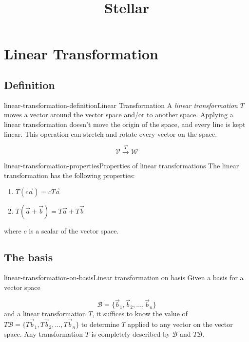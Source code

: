 \documentclass[preview]{standalone}
\begin{document}
\title{Stellar}
\genpage

\section{Linear Transformation}

\subsection{Definition}

\begin{snippetdefinition}{linear-transformation-definition}{Linear Transformation}
    A \textit{linear transformation} \(T\) moves a vector around the vector space and/or to another space.
    Applying a linear transformation doesn't move the origin of the space, and every line
    is kept linear. This operation can stretch and rotate every vector on the space.
    
    \[
        \mathcal{V} \xrightarrow{T} \mathcal{W}
    \]
\end{snippetdefinition}

\begin{snippetproposition}{linear-transformation-properties}{Properties of linear transformations}
    The linear transformation has the following properties:

    \begin{enumerate}
        \item \(T(c\vec{a})=cT\vec{a}\)
        \item \(T(\vec{a} + \vec{b}) = T\vec{a} + T\vec{b}\)
    \end{enumerate}
    
    where \(c\) is a scalar of the vector space.
\end{snippetproposition}

\subsection{The basis}


\begin{snippettheorem}{linear-transformation-on-basis}{Linear transformation on basis}
    Given a basis for a vector space

    \[
        \mathcal{B}=\{\vec{b}_1, \vec{b}_2, \ldots, \vec{b}_n\}
    \]
    and a linear transformation \(T\), it suffices
    to know the value of \(T\mathcal{B}=\{T\vec{b}_1, T\vec{b}_2, \ldots, T\vec{b}_n\}\)
    to determine \(T\) applied to any vector on the vector space.
    Any transformation \(T\) is completely described by \(\mathcal{B}\)
    and \(T\mathcal{B}\).
\end{snippettheorem}
\end{document}
